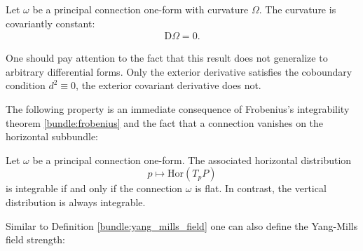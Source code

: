     \begin{property}
        Let $\omega$ be a principal connection one-form with curvature $\Omega$. The curvature is covariantly constant:
        \begin{gather}
            \mathrm{D}\Omega = 0.
        \end{gather}
    \end{property}
    \begin{remark}
        One should pay attention to the fact that this result\mnote{\dbend} does not generalize to arbitrary differential forms. Only the exterior derivative satisfies the coboundary condition $d^2\equiv0$, the exterior covariant derivative does not.
    \end{remark}


    The following property is an immediate consequence of Frobenius's integrability theorem \ref{bundle:frobenius} and the fact that a connection vanishes on the horizontal subbundle:
    \begin{property}[Integrability]
        Let $\omega$ be a principal connection one-form. The associated horizontal distribution \[p\mapsto\mathrm{Hor}(T_pP)\] is integrable if and only if the connection $\omega$ is flat. In contrast, the vertical distribution is always integrable.
    \end{property}

    Similar to Definition \ref{bundle:yang_mills_field} one can also define the Yang-Mills field strength:

